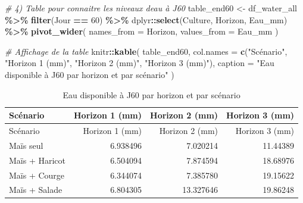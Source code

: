 \documentclass[
]{article}
\newenvironment{Shaded}{\begin{snugshade}}{\end{snugshade}}
\newcommand{\AttributeTok}[1]{\textcolor[rgb]{0.13,0.29,0.53}{#1}}
\newcommand{\CommentTok}[1]{\textcolor[rgb]{0.56,0.35,0.01}{\textit{#1}}}
\newcommand{\DecValTok}[1]{\textcolor[rgb]{0.00,0.00,0.81}{#1}}
\newcommand{\FunctionTok}[1]{\textcolor[rgb]{0.13,0.29,0.53}{\textbf{#1}}}
\newcommand{\NormalTok}[1]{#1}
\newcommand{\OtherTok}[1]{\textcolor[rgb]{0.56,0.35,0.01}{#1}}
\newcommand{\SpecialCharTok}[1]{\textcolor[rgb]{0.81,0.36,0.00}{\textbf{#1}}}
\newcommand{\StringTok}[1]{\textcolor[rgb]{0.31,0.60,0.02}{#1}}
\begin{document}
\begin{Shaded}
\begin{Highlighting}[]
\CommentTok{\# 4) Table pour connaitre les niveaux d\textquotesingle{}eau à J60}
\NormalTok{table\_end60 }\OtherTok{\textless{}{-}}\NormalTok{ df\_water\_all }\SpecialCharTok{\%\textgreater{}\%}
  \FunctionTok{filter}\NormalTok{(Jour }\SpecialCharTok{==} \DecValTok{60}\NormalTok{) }\SpecialCharTok{\%\textgreater{}\%}
\NormalTok{  dplyr}\SpecialCharTok{::}\FunctionTok{select}\NormalTok{(Culture, Horizon, Eau\_mm) }\SpecialCharTok{\%\textgreater{}\%}
  \FunctionTok{pivot\_wider}\NormalTok{(}
    \AttributeTok{names\_from  =}\NormalTok{ Horizon,}
    \AttributeTok{values\_from =}\NormalTok{ Eau\_mm}
\NormalTok{  )}

  \CommentTok{\# Affichage de la table}
\NormalTok{  knitr}\SpecialCharTok{::}\FunctionTok{kable}\NormalTok{(}
\NormalTok{    table\_end60,}
    \AttributeTok{col.names =} \FunctionTok{c}\NormalTok{(}\StringTok{"Scénario"}\NormalTok{, }\StringTok{"Horizon 1 (mm)"}\NormalTok{, }\StringTok{"Horizon 2 (mm)"}\NormalTok{, }\StringTok{"Horizon 3 (mm)"}\NormalTok{),}
    \AttributeTok{caption   =} \StringTok{"Eau disponible à J60 par horizon et par scénario"}
\NormalTok{  )}
\end{Highlighting}
\end{Shaded}

\begin{longtable}[]{@{}lrrr@{}}
\caption{Eau disponible à J60 par horizon et par
scénario}\tabularnewline
\toprule\noalign{}
Scénario & Horizon 1 (mm) & Horizon 2 (mm) & Horizon 3 (mm) \\
\midrule\noalign{}
\endfirsthead
\toprule\noalign{}
Scénario & Horizon 1 (mm) & Horizon 2 (mm) & Horizon 3 (mm) \\
\midrule\noalign{}
\endhead
\bottomrule\noalign{}
\endlastfoot
Maïs seul & 6.938496 & 7.020214 & 11.44389 \\
Maïs + Haricot & 6.504094 & 7.874594 & 18.68976 \\
Maïs + Courge & 6.344074 & 7.385780 & 19.15622 \\
Maïs + Salade & 6.804305 & 13.327646 & 19.86248 \\
\end{longtable}
\end{document}
